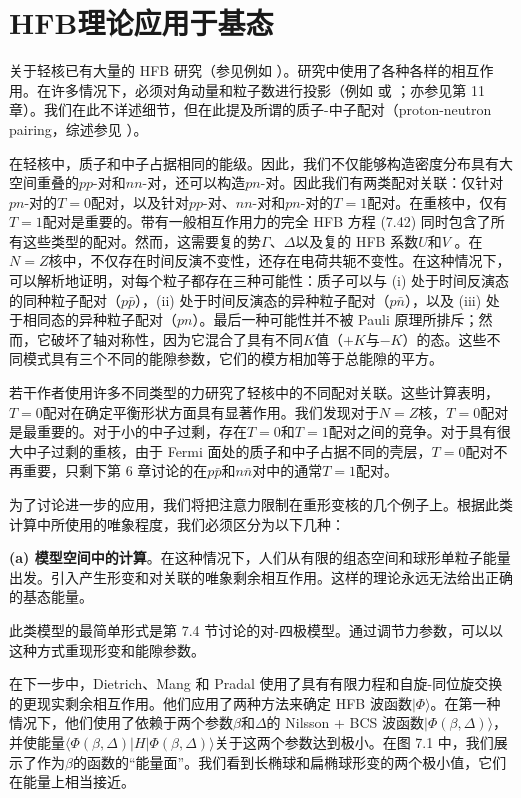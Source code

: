 \section{HFB理论应用于基态\label{sec:HFB=007406=008BBA=005E94=007528=004E8E=0057FA=006001}}

关于轻核已有大量的 HFB 研究（参见例如 \cite{WFS71,BKD73}）。研究中使用了各种各样的相互作用。在许多情况下，必须对角动量和粒子数进行投影（例如
\cite{GGF73} 或 \cite{GGA74}；亦参见第 11 章）。我们在此不详述细节，但在此提及所谓的质子-中子配对（proton-neutron
pairing，综述参见 \cite{Go79}）。

在轻核中，质子和中子占据相同的能级。因此，我们不仅能够构造密度分布具有大空间重叠的$pp$-对和$nn$-对，还可以构造$pn$-对\cite{Go64}。因此我们有两类配对关联：仅针对$pn$-对的$T=0$配对，以及针对$pp$-对、$nn$-对和$pn$-对的$T=1$配对。在重核中，仅有$T=1$配对是重要的。带有一般相互作用力的完全
HFB 方程 (7.42) 同时包含了所有这些类型的配对。然而，这需要复的势$\Gamma$、$\Delta$以及复的 HFB
系数$U$和$V$ \cite{GSB70}。在$N=Z$核中，不仅存在时间反演不变性，还存在电荷共轭不变性。在这种情况下，可以解析地证明\cite{Go72}，对每个粒子都存在三种可能性：质子可以与
(i) 处于时间反演态的同种粒子配对（$p\bar{p}$），(ii) 处于时间反演态的异种粒子配对（$p\bar{n}$），以及
(iii) 处于相同态的异种粒子配对（$pn$）。最后一种可能性并不被 Pauli 原理所排斥；然而，它破坏了轴对称性，因为它混合了具有不同$K$值（$+K$与$-K$）的态。这些不同模式具有三个不同的能隙参数，它们的模方相加等于总能隙的平方。

若干作者使用许多不同类型的力研究了轻核中的不同配对关联\cite{GK65,CCJ65,CCJ66,CG67,GSG68,BGG69,WFS70,WFS71}。这些计算表明，$T=0$配对在确定平衡形状方面具有显著作用。我们发现对于$N=Z$核，$T=0$配对是最重要的。对于小的中子过剩，存在$T=0$和$T=1$配对之间的竞争。对于具有很大中子过剩的重核，由于
Fermi 面处的质子和中子占据不同的壳层，$T=0$配对不再重要，只剩下第 6 章讨论的在$p\bar{p}$和$n\bar{n}$对中的通常$T=1$配对。

为了讨论进一步的应用，我们将把注意力限制在重形变核的几个例子上。根据此类计算中所使用的唯象程度，我们必须区分为以下几种：

\noindent\textbf{(a) 模型空间中的计算}。在这种情况下，人们从有限的组态空间和球形单粒子能量出发。引入产生形变和对关联的唯象剩余相互作用。这样的理论永远无法给出正确的基态能量。

此类模型的最简单形式是第 7.4 节讨论的对-四极模型。通过调节力参数，可以以这种方式重现形变和能隙参数。

在下一步中，Dietrich、Mang 和 Pradal \cite{DMP66} 使用了具有有限力程和自旋-同位旋交换的更现实剩余相互作用。他们应用了两种方法来确定
HFB 波函数$|\Phi\rangle$。在第一种情况下，他们使用了依赖于两个参数$\beta$和$\Delta$的 Nilsson
+ BCS 波函数$|\Phi(\beta,\Delta)\rangle$，并使能量$\langle\Phi(\beta,\Delta)|H|\Phi(\beta,\Delta)\rangle$关于这两个参数达到极小。在图
7.1 中，我们展示了作为$\beta$的函数的“能量面”。我们看到长椭球和扁椭球形变的两个极小值，它们在能量上相当接近。

